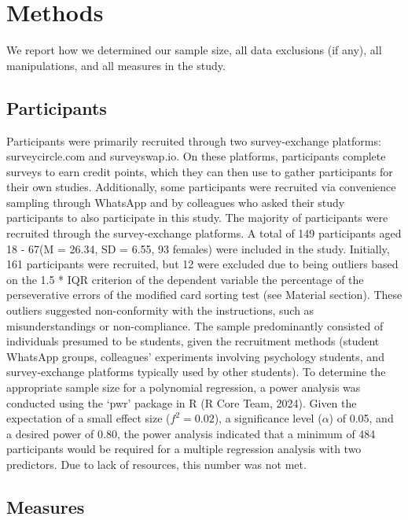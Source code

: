 \documentclass[
  man]{apa7}
\begin{document}
\section{Methods}\label{methods}

We report how we determined our sample size, all data exclusions (if any), all manipulations, and all measures in the study.

\subsection{Participants}\label{participants}

Participants were primarily recruited through two survey-exchange platforms: surveycircle.com and surveyswap.io. On these platforms, participants complete surveys to earn credit points, which they can then use to gather participants for their own studies. Additionally, some participants were recruited via convenience sampling through WhatsApp and by colleagues who asked their study participants to also participate in this study. The majority of participants were recruited through the survey-exchange platforms. A total of 149 participants aged 18 - 67(M = 26.34, SD = 6.55, 93 females) were included in the study. Initially, 161 participants were recruited, but 12 were excluded due to being outliers based on the 1.5 * IQR criterion of the dependent variable the percentage of the perseverative errors of the modified card sorting test (see Material section). These outliers suggested non-conformity with the instructions, such as misunderstandings or non-compliance. The sample predominantly consisted of individuals presumed to be students, given the recruitment methods (student WhatsApp groups, colleagues' experiments involving psychology students, and survey-exchange platforms typically used by other students). To determine the appropriate sample size for a polynomial regression, a power analysis was conducted using the `pwr' package in R (R Core Team, 2024). Given the expectation of a small effect size (\(f^2 = 0.02\)), a significance level (\(\alpha\)) of 0.05, and a desired power of 0.80, the power analysis indicated that a minimum of 484 participants would be required for a multiple regression analysis with two predictors. Due to lack of resources, this number was not met.

\subsection{Measures}\label{measures}
\end{document}
